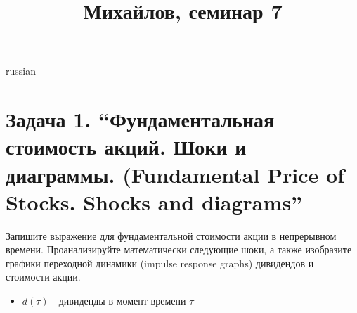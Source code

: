 \documentclass{article}
\begin{document}
\title{\foreignlanguage{russian}{Михайлов, семинар 7}}
\maketitle
\begin{otherlanguage*}{russian}
\section*{Задача 1. “Фундаментальная стоимость акций. Шоки и диаграммы.
(Fundamental Price of Stocks. Shocks and diagrams”}
Запишите выражение для фундаментальной стоимости акции в непрерывном времени. Проанализируйте математически следующие шоки, а также изобразите графики переходной динамики (impulse response graphs) дивидендов и стоимости акции. 
\begin{itemize}
\item $ d(\tau)$ - дивиденды в момент времени $ \tau $ 
\end{itemize}

\end{otherlanguage*}
\end{document}

